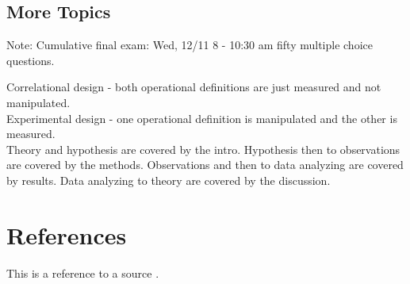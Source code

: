 \documentclass{report}
\begin{document}
\section{More Topics}

Note: Cumulative final exam: Wed, 12/11 8 - 10:30 am fifty multiple choice questions.

Correlational design - both operational definitions are just measured 
and not manipulated. \\
Experimental design - one operational definition is manipulated and the other is 
measured. \\

Theory and hypothesis are covered by the intro. Hypothesis then to observations are covered by the methods.
Observations and then to data analyzing are covered by results. Data analyzing to theory 
are covered by the discussion. \\ 

\chapter{References}
This is a reference to a source \cite{example}.



\end{document}
